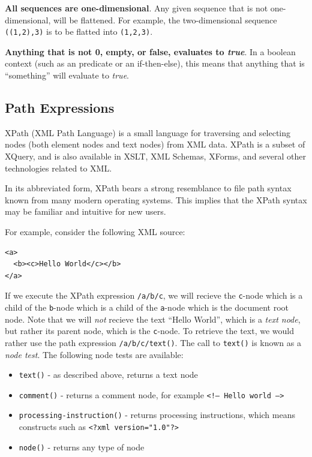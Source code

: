 \textbf{All sequences are one-dimensional}. Any given sequence that is not
one-dimensional, will be flattened. For example, the two-dimensional sequence
\verb!((1,2),3)! is to be flatted into \verb!(1,2,3)!.

\textbf{Anything that is not 0, empty, or false, evaluates to \textit{true}}.
In a boolean context (such as an predicate or an if-then-else), this means that
anything that is ``something'' will evaluate to \textit{true}.

\subsection{Path Expressions}
\label{sect:theory:xquery:PathExpressions}
XPath (XML Path Language) is a small language for traversing and selecting
nodes (both element nodes and text nodes) from XML data. XPath is a subset of
XQuery, and is also available in XSLT, XML Schemas, XForms, and several other
technologies related to XML. 

In its abbreviated form, XPath bears a strong resemblance to file path syntax
known from many modern operating systems. This implies that the XPath syntax
may be familiar and intuitive for new users.

For example, consider the following XML source:
\begin{Verbatim}
<a>
  <b><c>Hello World</c></b>
</a>
\end{Verbatim}
If we execute the XPath expression \verb!/a/b/c!, we will recieve the
\verb!c!-node which is a child of the \verb!b!-node which is a child of the
\verb!a!-node which is the document root node. Note that we will \textit{not}
recieve the text ``Hello World'', which is a \textit{text node}, but rather its
parent node, which is the \verb!c!-node. To retrieve the text, we would rather
use the path expression \verb!/a/b/c/text()!. The call to \verb!text()! is
known as a \textit{node test}. The following node tests are available:
\begin{itemize}
  \item \verb!text()! - as described above, returns a text node
  \item \verb!comment()! - returns a comment node, for example \texttt{<!-- Hello
  world -->}
  \item \verb!processing-instruction()! - returns processing instructions, which
  means constructs such as \texttt{<?xml version="1.0"?>}
  \item \verb!node()! - returns any type of node 
\end{itemize} 

